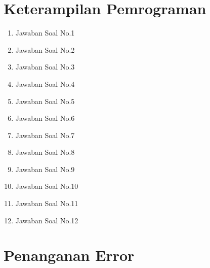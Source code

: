 \section{Keterampilan Pemrograman}
\begin{enumerate}
	\item Jawaban Soal No.1
	
	
	\item Jawaban Soal No.2
	
	
	\item Jawaban Soal No.3
	
	
	\item Jawaban Soal No.4
	
	
	\item Jawaban Soal No.5
	
	
	\item Jawaban Soal No.6
	
	
	\item Jawaban Soal No.7
	
	
	\item Jawaban Soal No.8
	
	
	\item Jawaban Soal No.9
	
	
	\item Jawaban Soal No.10
	
	
	\item Jawaban Soal No.11
	
	
	\item Jawaban Soal No.12
	
\end{enumerate}

\section{Penanganan Error}


